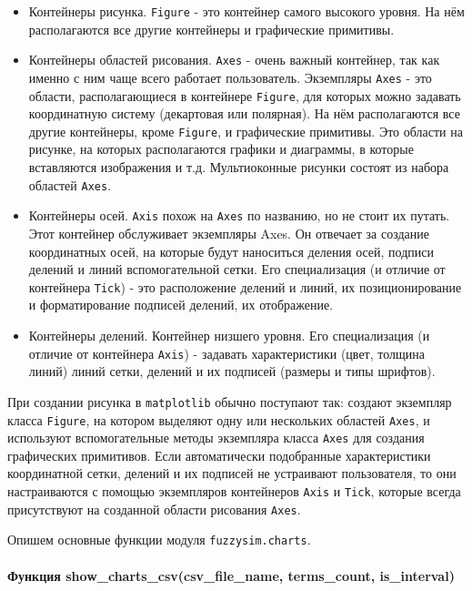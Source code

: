 \begin{itemize}
	\item  Контейнеры рисунка. \lstinline!Figure! - это контейнер самого высокого уровня. На нём располагаются все другие контейнеры и графические примитивы.

	\item  Контейнеры областей рисования. \lstinline!Axes! - очень важный контейнер, так как именно с ним чаще всего работает пользователь. Экземпляры \lstinline!Axes! - это области, располагающиеся в контейнере \lstinline!Figure!, для которых можно задавать координатную систему (декартовая или полярная). На нём располагаются все другие контейнеры, кроме \lstinline!Figure!, и графические примитивы. Это области на рисунке, на которых располагаются графики и диаграммы, в которые вставляются изображения и т.д. Мультиоконные рисунки состоят из набора областей \lstinline!Axes!.

	\item  Контейнеры осей. \lstinline!Axis! похож на \lstinline!Axes! по названию, но не стоит их путать. Этот контейнер обслуживает экземпляры Axes. Он отвечает за создание координатных осей, на которые будут наноситься деления осей, подписи делений и линий вспомогательной сетки. Его специализация (и отличие от контейнера \lstinline!Tick!) - это расположение делений и линий, их позиционирование и форматирование подписей делений, их отображение.

	\item  Контейнеры делений. Контейнер низшего уровня. Его специализация (и отличие от контейнера \lstinline!Axis!) - задавать характеристики (цвет, толщина линий) линий сетки, делений и их подписей (размеры и типы шрифтов).
\end{itemize}

При создании рисунка в \lstinline!matplotlib! обычно поступают так: создают экземпляр класса \lstinline!Figure!, на котором выделяют одну или нескольких областей \lstinline!Axes!, и используют вспомогательные методы экземпляра класса \lstinline!Axes! для создания графических примитивов. Если автоматически подобранные характеристики координатной сетки, делений и их подписей не устраивают пользователя, то они настраиваются с помощью экземпляров контейнеров \lstinline!Axis! и \lstinline!Tick!, которые всегда присутствуют на созданной области рисования \lstinline!Axes!.

Опишем основные функции модуля \lstinline!fuzzysim.charts!.

\paragraph{Функция show\_charts\_csv(csv\_file\_name, terms\_count, is\_interval)}

